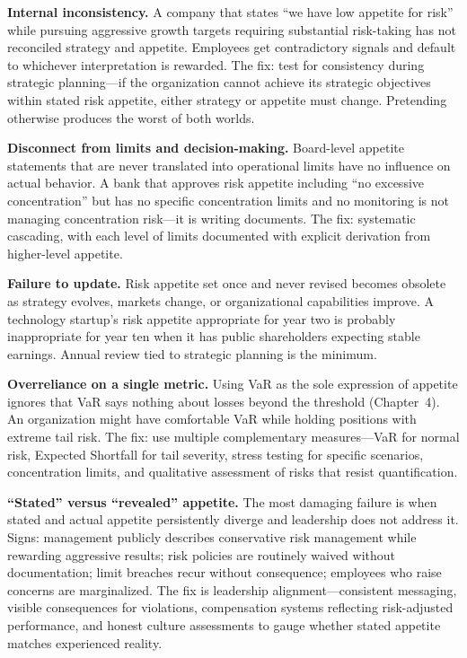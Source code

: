 \documentclass[11pt,openany]{book}
\begin{document}
\textbf{Internal inconsistency.} A company that states ``we have low appetite for
risk'' while pursuing aggressive growth targets requiring substantial risk-taking
has not reconciled strategy and appetite. Employees get contradictory signals and
default to whichever interpretation is rewarded. The fix: test for consistency
during strategic planning---if the organization cannot achieve its strategic
objectives within stated risk appetite, either strategy or appetite must change.
Pretending otherwise produces the worst of both worlds.

\textbf{Disconnect from limits and decision-making.} Board-level appetite
statements that are never translated into operational limits have no influence on
actual behavior. A bank that approves risk appetite including ``no excessive
concentration'' but has no specific concentration limits and no monitoring is not
managing concentration risk---it is writing documents. The fix: systematic
cascading, with each level of limits documented with explicit derivation from
higher-level appetite.

\textbf{Failure to update.} Risk appetite set once and never revised becomes
obsolete as strategy evolves, markets change, or organizational capabilities
improve. A technology startup's risk appetite appropriate for year two is
probably inappropriate for year ten when it has public shareholders expecting
stable earnings. Annual review tied to strategic planning is the minimum.

\textbf{Overreliance on a single metric.} Using VaR as the sole expression of
appetite ignores that VaR says nothing about losses beyond the threshold
(Chapter~4). An organization might have comfortable VaR while holding positions
with extreme tail risk. The fix: use multiple complementary measures---VaR for
normal risk, Expected Shortfall for tail severity, stress testing for specific
scenarios, concentration limits, and qualitative assessment of risks that resist
quantification.

\textbf{``Stated'' versus ``revealed'' appetite.} The most damaging failure is
when stated and actual appetite persistently diverge and leadership does not
address it. Signs: management publicly describes conservative risk management
while rewarding aggressive results; risk policies are routinely waived without
documentation; limit breaches recur without consequence; employees who raise
concerns are marginalized. The fix is leadership alignment---consistent messaging,
visible consequences for violations, compensation systems reflecting
risk-adjusted performance, and honest culture assessments to gauge whether stated
appetite matches experienced reality.
\end{document}
